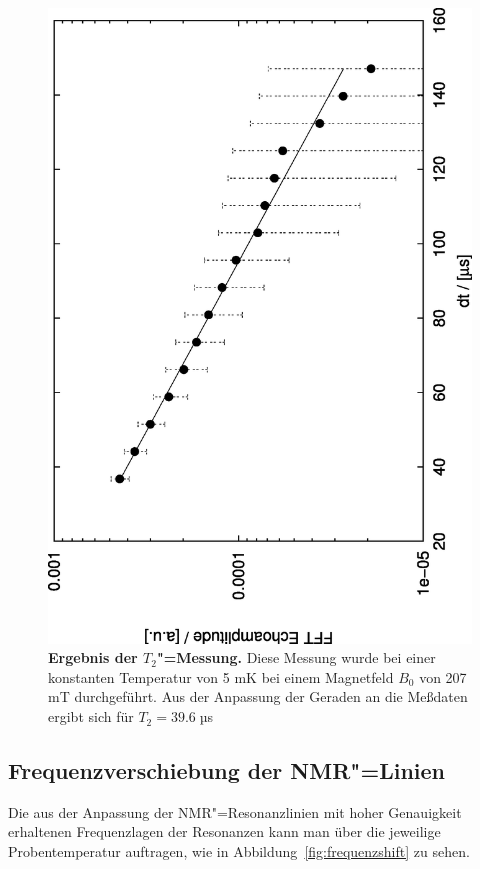 \begin{figure}[htp]
	\begin{center}
		\includegraphics[angle=-90,width=\midwidth]{plots/t2_aug0897_4}
	\end{center}
	\caption[Ergebnis der $T_2$"=Messung]{{\upshape\bfseries Ergebnis der $T_2$"=Messung.} Diese Messung wurde bei einer
		konstanten Temperatur von 5 mK bei einem Magnetfeld $B_0$ von 207 mT durchgeführt. Aus
		der Anpassung der Geraden an die Meßdaten ergibt sich für $T_2=39.6\;$µs}
	\label{fig:t2ergebnis}
 \end{figure}

\subsection{Frequenzverschiebung der NMR"=Linien}
Die aus der Anpassung der NMR"=Resonanzlinien mit hoher Genauigkeit erhaltenen Frequenzlagen der
Resonanzen kann man über die jeweilige Probentemperatur auftragen, wie in Abbildung~\ref{fig:frequenzshift}
zu sehen.

